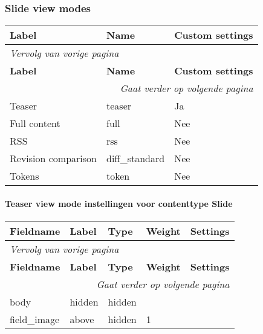 \subsubsection{Slide view modes}
  \begin{longtable}{| p{5.00cm}|p{5.00cm}|p{5.00cm}|}
  \hline
  \rowcolor{tableheader}
  \textbf{Label} & \textbf{Name} & \textbf{Custom settings}  \tabularnewline
  \hline
\endfirsthead
\multicolumn{3}{l}{\textit{Vervolg van vorige pagina}} \\
\hline
\rowcolor{tableheader}
  \textbf{Label} & \textbf{Name} & \textbf{Custom settings}  \tabularnewline
  \hline
\hline
\endhead
\multicolumn{3}{r}{\textit{Gaat verder op volgende pagina}} \\
\endfoot
\hline
\endlastfoot
  Teaser & teaser & Ja  \tabularnewline
  \hline
  Full content & full & Nee  \tabularnewline
  \hline
  RSS & rss & Nee  \tabularnewline
  \hline
  Revision comparison & diff\_standard & Nee  \tabularnewline
  \hline
  Tokens & token & Nee  \tabularnewline
  \hline
  \end{longtable}

\paragraph{Teaser view mode instellingen voor contenttype Slide }

  \begin{longtable}{| p{3.00cm}|p{3.00cm}|p{3.00cm}|p{3.00cm}|p{3.00cm}|}
  \hline
  \rowcolor{tableheader}
  \textbf{Fieldname} & \textbf{Label} & \textbf{Type} & \textbf{Weight} & \textbf{Settings}  \tabularnewline
  \hline
\endfirsthead
\multicolumn{5}{l}{\textit{Vervolg van vorige pagina}} \\
\hline
\rowcolor{tableheader}
  \textbf{Fieldname} & \textbf{Label} & \textbf{Type} & \textbf{Weight} & \textbf{Settings}  \tabularnewline
  \hline
\hline
\endhead
\multicolumn{5}{r}{\textit{Gaat verder op volgende pagina}} \\
\endfoot
\hline
\endlastfoot
  body & hidden & hidden &   &    \tabularnewline
  \hline
  field\_image & above & hidden & 1 &    \tabularnewline
  \hline
  \end{longtable}

